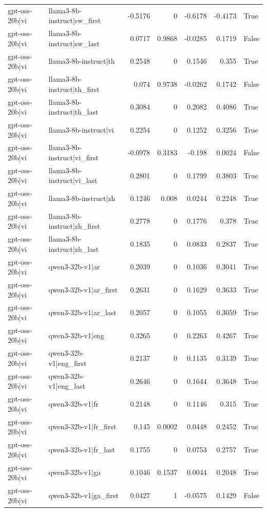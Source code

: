 \begin{table}
\begin{tabular}{l l r r r r l}
gpt-oss-20b|vi & llama3-8b-instruct|sw_first & -0.5176 & 0 & -0.6178 & -0.4173 & True \\
gpt-oss-20b|vi & llama3-8b-instruct|sw_last & 0.0717 & 0.9868 & -0.0285 & 0.1719 & False \\
gpt-oss-20b|vi & llama3-8b-instruct|th & 0.2548 & 0 & 0.1546 & 0.355 & True \\
gpt-oss-20b|vi & llama3-8b-instruct|th_first & 0.074 & 0.9738 & -0.0262 & 0.1742 & False \\
gpt-oss-20b|vi & llama3-8b-instruct|th_last & 0.3084 & 0 & 0.2082 & 0.4086 & True \\
gpt-oss-20b|vi & llama3-8b-instruct|vi & 0.2254 & 0 & 0.1252 & 0.3256 & True \\
gpt-oss-20b|vi & llama3-8b-instruct|vi_first & -0.0978 & 0.3183 & -0.198 & 0.0024 & False \\
gpt-oss-20b|vi & llama3-8b-instruct|vi_last & 0.2801 & 0 & 0.1799 & 0.3803 & True \\
gpt-oss-20b|vi & llama3-8b-instruct|zh & 0.1246 & 0.008 & 0.0244 & 0.2248 & True \\
gpt-oss-20b|vi & llama3-8b-instruct|zh_first & 0.2778 & 0 & 0.1776 & 0.378 & True \\
gpt-oss-20b|vi & llama3-8b-instruct|zh_last & 0.1835 & 0 & 0.0833 & 0.2837 & True \\
gpt-oss-20b|vi & qwen3-32b-v1|ar & 0.2039 & 0 & 0.1036 & 0.3041 & True \\
gpt-oss-20b|vi & qwen3-32b-v1|ar_first & 0.2631 & 0 & 0.1629 & 0.3633 & True \\
gpt-oss-20b|vi & qwen3-32b-v1|ar_last & 0.2057 & 0 & 0.1055 & 0.3059 & True \\
gpt-oss-20b|vi & qwen3-32b-v1|eng & 0.3265 & 0 & 0.2263 & 0.4267 & True \\
gpt-oss-20b|vi & qwen3-32b-v1|eng_first & 0.2137 & 0 & 0.1135 & 0.3139 & True \\
gpt-oss-20b|vi & qwen3-32b-v1|eng_last & 0.2646 & 0 & 0.1644 & 0.3648 & True \\
gpt-oss-20b|vi & qwen3-32b-v1|fr & 0.2148 & 0 & 0.1146 & 0.315 & True \\
gpt-oss-20b|vi & qwen3-32b-v1|fr_first & 0.145 & 0.0002 & 0.0448 & 0.2452 & True \\
gpt-oss-20b|vi & qwen3-32b-v1|fr_last & 0.1755 & 0 & 0.0753 & 0.2757 & True \\
gpt-oss-20b|vi & qwen3-32b-v1|ga & 0.1046 & 0.1537 & 0.0044 & 0.2048 & True \\
gpt-oss-20b|vi & qwen3-32b-v1|ga_first & 0.0427 & 1 & -0.0575 & 0.1429 & False \\

\end{tabular}
\end{table}
